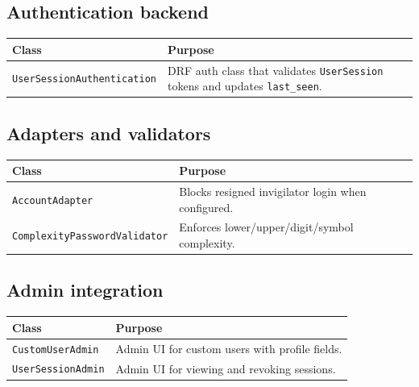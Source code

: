 \subsection{Authentication backend}
\label{subsec:accounts:ref:authbackend}

\begin{longtable}{p{}p{}}
\toprule
\textbf{Class} & \textbf{Purpose} \\
\midrule
\texttt{UserSessionAuthentication} & DRF auth class that validates \texttt{UserSession} tokens and updates \texttt{last\_seen}. \\
\bottomrule
\end{longtable}

\subsection{Adapters and validators}
\label{subsec:accounts:ref:adapters}

\begin{longtable}{p{}p{}}
\toprule
\textbf{Class} & \textbf{Purpose} \\
\midrule
\texttt{AccountAdapter} & Blocks resigned invigilator login when configured. \\
\texttt{ComplexityPasswordValidator} & Enforces lower/upper/digit/symbol complexity. \\
\bottomrule
\end{longtable}

\subsection{Admin integration}
\label{subsec:accounts:ref:admin}

\begin{longtable}{p{}p{}}
\toprule
\textbf{Class} & \textbf{Purpose} \\
\midrule
\texttt{CustomUserAdmin} & Admin UI for custom users with profile fields. \\
\texttt{UserSessionAdmin} & Admin UI for viewing and revoking sessions. \\
\bottomrule
\end{longtable}
